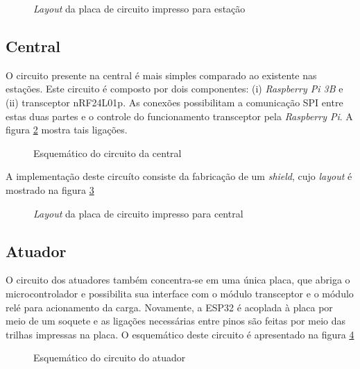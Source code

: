 \begin{figure}[H]
	\centering
	\caption{\emph{Layout} da placa de circuito impresso para estação}
	\label{ele_pc2_gab_04}
\end{figure}		


	\subsection{Central}
	O circuito presente na central é mais simples comparado ao existente nas estações. Este circuito é composto por dois componentes: (i) \emph{Raspberry Pi 3B} e (ii) transceptor nRF24L01p. As conexões possibilitam a comunicação SPI entre estas duas partes e o controle do funcionamento transceptor pela \emph{Raspberry Pi}. A figura \ref{ele_pc2_gab_05} mostra tais ligações.

\begin{figure}[H]
	\centering
	\caption{Esquemático do circuito da central}
	\label{ele_pc2_gab_05}
\end{figure}		

A implementação deste circuíto consiste da fabricação de um \emph{shield}, cujo \emph{layout}  é mostrado na figura \ref{ele_pc2_gab_06}
	
	\begin{figure}[H]
		\centering
		\caption{\emph{Layout} da placa de circuito impresso para central}
		\label{ele_pc2_gab_06}
\end{figure}		

		

	\subsection{Atuador}


O circuito dos atuadores também concentra-se em uma única placa, que abriga o microcontrolador e possibilita sua interface com o módulo transceptor  e o módulo relé para acionamento da carga. Novamente, a ESP32 é acoplada à placa por meio de um soquete e as ligações necessárias entre pinos são feitas por meio das trilhas impressas na placa. O esquemático deste circuito é  apresentado na figura \ref{ele_pc2_gab_07} 

\begin{figure}[H]
	\centering
	\caption{Esquemático do circuito do atuador}
	\label{ele_pc2_gab_07}
\end{figure}

